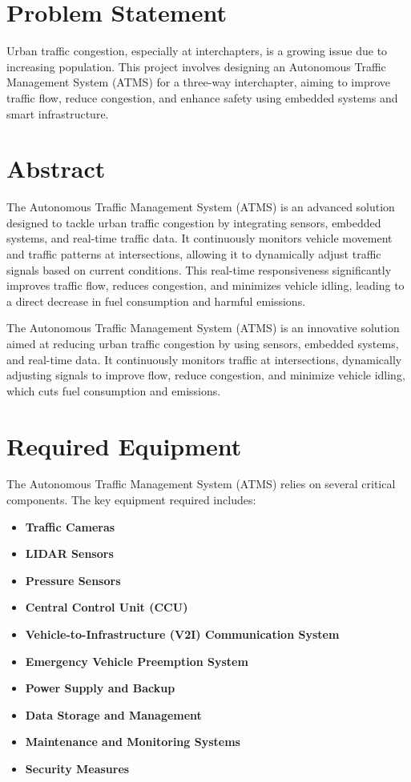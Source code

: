 \documentclass{scrreprt}
\begin{document}
\section*{Problem Statement}
Urban traffic congestion, especially at interchapters, is a growing issue due to increasing population. This project involves designing an Autonomous Traffic Management System (ATMS) for a three-way interchapter, aiming to improve traffic flow, reduce congestion, and enhance safety using embedded systems and smart infrastructure.

\section*{Abstract}
The Autonomous Traffic Management System (ATMS) is an advanced solution designed to tackle urban traffic congestion by integrating sensors, embedded systems, and real-time traffic data. It continuously monitors vehicle movement and traffic patterns at intersections, allowing it to dynamically adjust traffic signals based on current conditions. This real-time responsiveness significantly improves traffic flow, reduces congestion, and minimizes vehicle idling, leading to a direct decrease in fuel consumption and harmful emissions.

The Autonomous Traffic Management System (ATMS) is an innovative solution aimed at reducing urban traffic congestion by using sensors, embedded systems, and real-time data. It continuously monitors traffic at intersections, dynamically adjusting signals to improve flow, reduce congestion, and minimize vehicle idling, which cuts fuel consumption and emissions.

\section*{Required Equipment}

The Autonomous Traffic Management System (ATMS) relies on several critical components. The key equipment required includes:

\begin{itemize}
    \item \textbf{Traffic Cameras}
    \item \textbf{LIDAR Sensors}
    \item \textbf{Pressure Sensors}
    \item \textbf{Central Control Unit (CCU)}
    \item \textbf{Vehicle-to-Infrastructure (V2I) Communication System}
    \item \textbf{Emergency Vehicle Preemption System}
    \item \textbf{Power Supply and Backup}
    \item \textbf{Data Storage and Management}
    \item \textbf{Maintenance and Monitoring Systems}
    \item \textbf{Security Measures}
\end{itemize}
\end{document}
